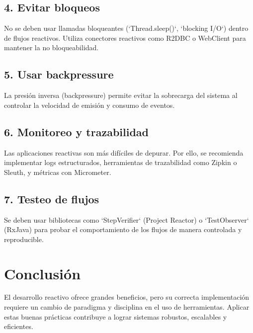 \documentclass[12pt]{article}
\begin{document}
\subsection{4. Evitar bloqueos}
No se deben usar llamadas bloqueantes (`Thread.sleep()`, `blocking I/O`) dentro de flujos reactivos. Utiliza conectores reactivos como R2DBC o WebClient para mantener la no bloqueabilidad.

\subsection{5. Usar backpressure}
La presión inversa (backpressure) permite evitar la sobrecarga del sistema al controlar la velocidad de emisión y consumo de eventos.

\subsection{6. Monitoreo y trazabilidad}
Las aplicaciones reactivas son más difíciles de depurar. Por ello, se recomienda implementar logs estructurados, herramientas de trazabilidad como Zipkin o Sleuth, y métricas con Micrometer.

\subsection{7. Testeo de flujos}
Se deben usar bibliotecas como `StepVerifier` (Project Reactor) o `TestObserver` (RxJava) para probar el comportamiento de los flujos de manera controlada y reproducible.

\section{Conclusión}
El desarrollo reactivo ofrece grandes beneficios, pero su correcta implementación requiere un cambio de paradigma y disciplina en el uso de herramientas. Aplicar estas buenas prácticas contribuye a lograr sistemas robustos, escalables y eficientes.

\printbibliography
\end{document}
